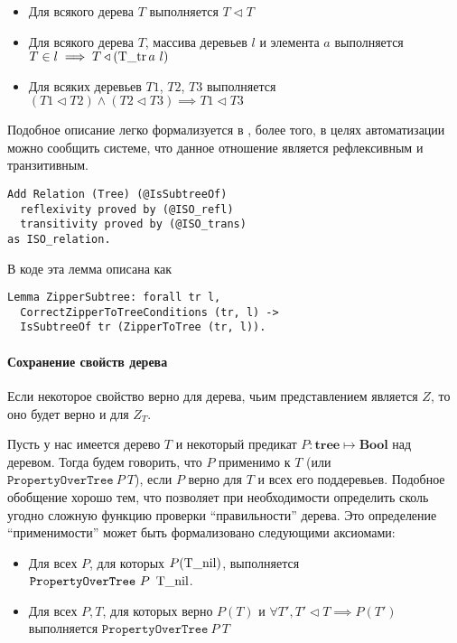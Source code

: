 \begin{itemize}
\item Для всякого дерева $T$ выполняется $T \triangleleft T$
\item Для всякого дерева $T$, массива деревьев $l$ и элемента $a$ выполняется $T \in l \implies T \triangleleft (\operatorname{T\_tr} a \ l)$
\item Для всяких деревьев $T1$, $T2$, $T3$ выполняется $(T1 \triangleleft T2) \wedge (T2 \triangleleft T3) \implies T1 \triangleleft T3$
\end{itemize}

Подобное описание легко формализуется в \tcoq, более того, в целях автоматизации можно сообщить системе, что данное отношение является рефлексивным и транзитивным.

\begin{lstlisting}
Add Relation (Tree) (@IsSubtreeOf)
  reflexivity proved by (@ISO_refl)
  transitivity proved by (@ISO_trans)
as ISO_relation.
\end{lstlisting}

В коде эта лемма описана как
\begin{lstlisting}
Lemma ZipperSubtree: forall tr l,
  CorrectZipperToTreeConditions (tr, l) ->
  IsSubtreeOf tr (ZipperToTree (tr, l)).
\end{lstlisting}

\paragraph{Сохранение свойств дерева}
Если некоторое свойство верно для дерева, чьим представлением является $Z$, то оно будет верно и для $Z_T$. 

Пусть у нас имеется дерево $T$ и некоторый предикат $P : \textbf{tree} \mapsto \textbf{Bool}$ над деревом. Тогда будем говорить, что $P$ применимо к $T$ (или $\texttt{PropertyOverTree}\ P\ T$), если $P$ верно для $T$ и всех его поддеревьев. Подобное обобщение хорошо тем, что позволяет при необходимости определить сколь угодно сложную функцию проверки ``правильности'' дерева. Это определение ``применимости'' может быть формализовано следующими аксиомами:

\begin{itemize}
\item Для всех $P$, для которых $P(\operatorname{T\_nil})$, выполняется $\texttt{PropertyOverTree}\ P\ \btnil$.
\item Для всех $P, T$, для которых верно $P(T)$ и $\forall T', T' \triangleleft T \implies P(T')$ выполняется $\texttt{PropertyOverTree}\ P\ T$
\end{itemize}


